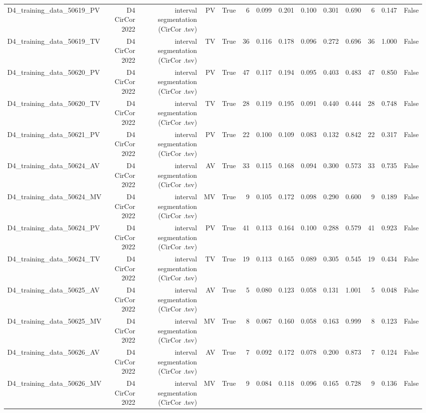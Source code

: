 \begin{table}[htbp]
\begin{tabular}{lrrrrrrrrrrrrr}
    D4\_training\_data\_50619\_PV & D4 CirCor 2022 & interval segmentation (CirCor .tsv) & PV & True & 6 & 0.099 & 0.201 & 0.100 & 0.301 & 0.690 & 6 & 0.147 & False \\
    D4\_training\_data\_50619\_TV & D4 CirCor 2022 & interval segmentation (CirCor .tsv) & TV & True & 36 & 0.116 & 0.178 & 0.096 & 0.272 & 0.696 & 36 & 1.000 & False \\
    D4\_training\_data\_50620\_PV & D4 CirCor 2022 & interval segmentation (CirCor .tsv) & PV & True & 47 & 0.117 & 0.194 & 0.095 & 0.403 & 0.483 & 47 & 0.850 & False \\
    D4\_training\_data\_50620\_TV & D4 CirCor 2022 & interval segmentation (CirCor .tsv) & TV & True & 28 & 0.119 & 0.195 & 0.091 & 0.440 & 0.444 & 28 & 0.748 & False \\
    D4\_training\_data\_50621\_PV & D4 CirCor 2022 & interval segmentation (CirCor .tsv) & PV & True & 22 & 0.100 & 0.109 & 0.083 & 0.132 & 0.842 & 22 & 0.317 & False \\
    D4\_training\_data\_50624\_AV & D4 CirCor 2022 & interval segmentation (CirCor .tsv) & AV & True & 33 & 0.115 & 0.168 & 0.094 & 0.300 & 0.573 & 33 & 0.735 & False \\
    D4\_training\_data\_50624\_MV & D4 CirCor 2022 & interval segmentation (CirCor .tsv) & MV & True & 9 & 0.105 & 0.172 & 0.098 & 0.290 & 0.600 & 9 & 0.189 & False \\
    D4\_training\_data\_50624\_PV & D4 CirCor 2022 & interval segmentation (CirCor .tsv) & PV & True & 41 & 0.113 & 0.164 & 0.100 & 0.288 & 0.579 & 41 & 0.923 & False \\
    D4\_training\_data\_50624\_TV & D4 CirCor 2022 & interval segmentation (CirCor .tsv) & TV & True & 19 & 0.113 & 0.165 & 0.089 & 0.305 & 0.545 & 19 & 0.434 & False \\
    D4\_training\_data\_50625\_AV & D4 CirCor 2022 & interval segmentation (CirCor .tsv) & AV & True & 5 & 0.080 & 0.123 & 0.058 & 0.131 & 1.001 & 5 & 0.048 & False \\
    D4\_training\_data\_50625\_MV & D4 CirCor 2022 & interval segmentation (CirCor .tsv) & MV & True & 8 & 0.067 & 0.160 & 0.058 & 0.163 & 0.999 & 8 & 0.123 & False \\
    D4\_training\_data\_50626\_AV & D4 CirCor 2022 & interval segmentation (CirCor .tsv) & AV & True & 7 & 0.092 & 0.172 & 0.078 & 0.200 & 0.873 & 7 & 0.124 & False \\
    D4\_training\_data\_50626\_MV & D4 CirCor 2022 & interval segmentation (CirCor .tsv) & MV & True & 9 & 0.084 & 0.118 & 0.096 & 0.165 & 0.728 & 9 & 0.136 & False \\

\end{tabular}
\end{table}
